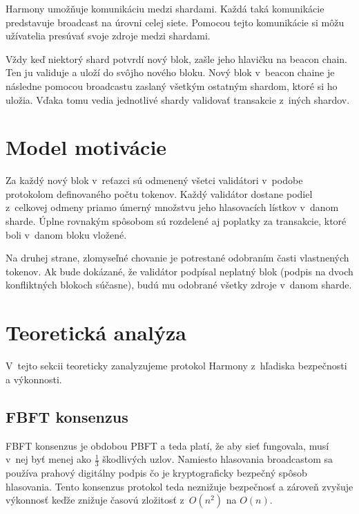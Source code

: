 Harmony umožňuje komunikáciu medzi shardami. Každá taká komunikácie predstavuje broadcast na úrovni celej siete. Pomocou tejto komunikácie si môžu užívatelia presúvať svoje zdroje medzi shardami. 

Vždy keď niektorý shard potvrdí nový blok, zašle jeho hlavičku na beacon chain. Ten ju validuje a uloží do svôjho nového bloku. Nový blok v~beacon chaine je následne pomocou broadcastu zaslaný všetkým ostatným shardom, ktoré si ho uložia. Vďaka tomu vedia jednotlivé shardy validovať transakcie z~iných shardov.

\section{Model motivácie}\label{sec:harmony-incenctives}

Za každý nový blok v~reťazci sú odmenený všetci validátori v~podobe protokolom definovaného počtu tokenov. Každý validátor dostane podiel z~celkovej odmeny priamo úmerný množstvu jeho hlasovacích lístkov v~danom sharde. Úplne rovnakým spôsobom sú rozdelené aj poplatky za transakcie, ktoré boli v~danom bloku vložené.

Na druhej strane, zlomyseľné chovanie je potrestané odobraním časti vlastnených tokenov. Ak bude dokázané, že validátor podpísal neplatný blok (podpis na dvoch konfliktných blokoch súčasne), budú mu odobrané všetky zdroje v~danom sharde.

\section{Teoretická analýza}\label{sec:harmony-analyze}
V~tejto sekcii teoreticky zanalyzujeme protokol Harmony z~hľadiska bezpečnosti a výkonnosti.

\subsection{FBFT konsenzus}
FBFT konsenzus je obdobou PBFT a teda platí, že aby sieť fungovala, musí v~nej byť menej ako $\frac{1}{3}$ škodlivých uzlov. Namiesto hlasovania broadcastom sa používa prahový digitálny podpis čo je kryptograficky bezpečný spôsob hlasovania. Tento konsenzus protokol teda neznižuje bezpečnosť a zároveň zvyšuje výkonnosť keďže znižuje časovú zložitosť z~$O(n^2)$ na $O(n)$.

